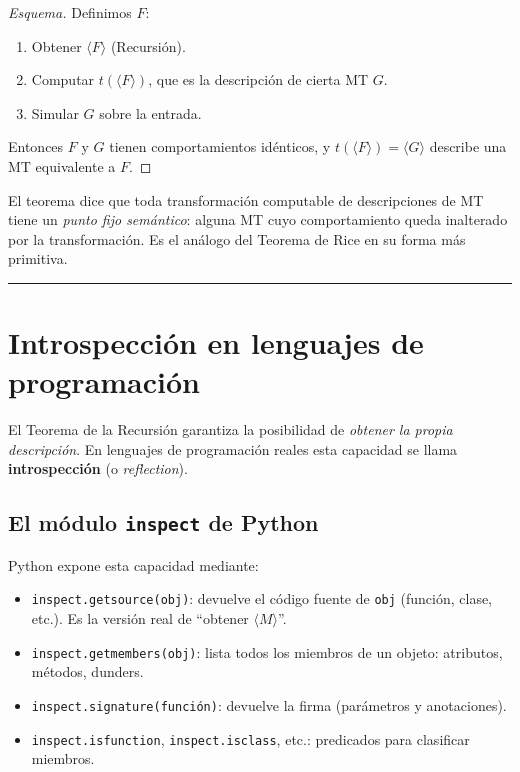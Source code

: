 \documentclass[11pt,a4paper]{article}
\theoremstyle{plain}
\theoremstyle{definition}
\theoremstyle{remark}
\newcommand{\enc}[1]{\langle #1\rangle}
\begin{document}
\begin{proof}[Esquema]
Definimos $F$:
\begin{enumerate}
  \item Obtener $\enc{F}$ (Recursi\'on).
  \item Computar $t(\enc{F})$, que es la descripci\'on de cierta MT $G$.
  \item Simular $G$ sobre la entrada.
\end{enumerate}
Entonces $F$ y $G$ tienen comportamientos id\'enticos, y $t(\enc{F})=\enc{G}$
describe una MT equivalente a $F$.
\end{proof}

El teorema dice que toda transformaci\'on computable de descripciones de MT
tiene un \emph{punto fijo sem\'antico}: alguna MT cuyo comportamiento queda
inalterado por la transformaci\'on. Es el an\'alogo del Teorema de Rice en
su forma m\'as primitiva.

\bigskip\hrule\bigskip

\section{Introspecci\'on en lenguajes de programaci\'on}

El Teorema de la Recursi\'on garantiza la posibilidad de \emph{obtener la
propia descripci\'on}. En lenguajes de programaci\'on reales esta capacidad
se llama \textbf{introspecci\'on} (o \emph{reflection}).

\subsection{El m\'odulo \texttt{inspect} de Python}

Python expone esta capacidad mediante:
\begin{itemize}
  \item \texttt{inspect.getsource(obj)}: devuelve el c\'odigo fuente de
        \texttt{obj} (funci\'on, clase, etc.). Es la versi\'on real de
        ``obtener $\enc{M}$''.
  \item \texttt{inspect.getmembers(obj)}: lista todos los miembros de un
        objeto: atributos, m\'etodos, dunders.
  \item \texttt{inspect.signature(funci\'on)}: devuelve la firma
        (par\'ametros y anotaciones).
  \item \texttt{inspect.isfunction}, \texttt{inspect.isclass}, etc.:
        predicados para clasificar miembros.
\end{itemize}
\end{document}
